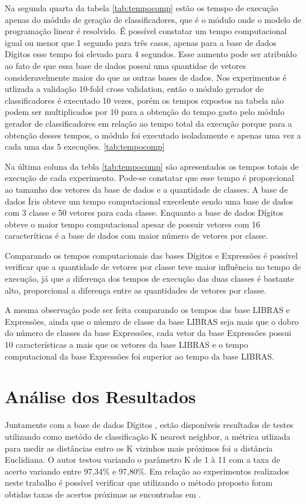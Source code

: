 Na segunda quarta da tabela \ref{tab:tempocomp} estão os temspo de execução apenas do módulo de geração de classificadores, que é o módulo onde o modelo de programação linear é resolvido. É possível constatar um tempo computacional igual ou menor que 1 segundo para três casos, apenas para a base de dados Dígitos esse tempo foi elevado para 4 segundos. Esse aumento pode ser atribuído ao fato de que essa base de dados possui uma quantidae de vetores consideravelmente maior do que as outras bases de dados. Nos experimentos é utlizada a validação 10-fold cross validation, então o módulo gerador de classificadores é executado 10 vezes, porém os tempos expostos na tabela não podem ser multiplicados por 10 para a obtenção do tempo gasto pelo módulo gerador de classificadores em relação ao tempo total da execução porque para a obtenção desses tempos, o módulo foi executado isoladamente e apenas uma vez a cada uma das 5 execuções. \ref{tab:tempocomp}

Na última coluna da tebla \ref{tab:tempocomp} são apresentados os tempos totais de execução de cada experimento. Pode-se constatar que esse tempo é proporcional ao tamanho dos vetores da base de dados e a quantidade de classes. A base de dados Íris obteve um tempo computacional execelente sendo uma base de dados com 3 classe e 50 vetores para cada classe. Enquanto a base de dados Dígitos obteve o maior tempo computacional apesar de possuir vetores com 16 caracteríticas é a base de dados com maior número de vetores por classe. 

Comparando os tempos computacionais das bases Dígitos e Expressões é possível verificar que a quantidade de vetores por classe teve maior influência no tempo de execução, já que a diferença dos tempos de execução das duas classes é bastante alto, proporcional a diferença entre as quantidades de vetores por classe. 

A mesma observação pode ser feita comparando os tempos das base LIBRAS e Expressões, ainda que o núemro de classe da base LIBRAS seja mais que o dobro do número de classes da base Expressões, cada vetor da base Expressões possui 10 características a mais que os vetores da base LIBRAS e o tempo computacional da base Expressões foi superior ao tempo da base LIBRAS.

\section{Análise dos Resultados}

Juntamente com a base de dados Dígitos \cite{Digitos}, estão disponíveis resultados de testes utilizando como metódo de classificação K nearest neighbor, a métrica utlizada para medir as distâncias entro os K vizinhos mais próximos foi a distância Euclidiana. O autor testou variando o parâmetro K de 1 à 11 com a taxa de acerto variando entre 97,34\% e 97,80\%. Em relação ao experimentos realizados neste trabalho é possível verificar que utilizando o método proposto foram obtidas taxas de acertos próximas as encontradas em .

